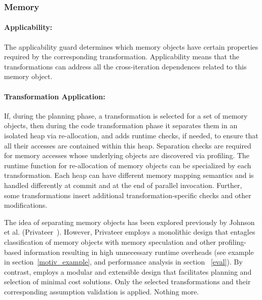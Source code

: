 \subsubsection{Memory} 
%
\paragraph{Applicability:}
The applicability guard determines which memory objects have certain
properties required by the corresponding transformation.
%
Applicability means that the transformations can address all the
cross-iteration dependences related to this memory object. 
%
%
%
%


\paragraph{Transformation Application:} If, during the planning phase,
a transformation is selected for a set of memory objects, then during
the code transformation phase it separates them in an isolated heap
via re-allocation, and adds runtime checks, if needed, to ensure that
all their accesses are contained within this heap.  
Separation checks are required for memory accesses whose underlying
objects are discovered via profiling.
The runtime function for re-allocation of memory objects can be
specialized by each transformation.
%
Each heap can have different memory mapping semantics and is handled
differently at commit and at the end of parallel invocation. 
%
Further, some transformations insert additional transformation-specific
checks and other modifications.

The idea of separating memory objects has been explored previously by
Johnson et al. (Privateer~\cite{johnson:12:pldi}).  However, Privateer
employs a monolithic design that entagles classification of memory
objects with memory speculation and other 
profiling-based information resulting in high unnecessary runtime
overheads (see example in section~\ref{motiv_example}, and performance
analysis in section ~\ref{eval}).
%
By contrast, \name employs a modular and extensible design that
facilitates planning and selection of minimal cost solutions.
%
Only the selected transformations and their corresponding assumption
validation is applied.  Nothing more.



